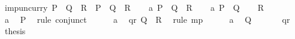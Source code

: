 %
\begin{isabellebody}%
\isanewline
\isamarkupfalse%
\ imp{\isacharunderscore}uncurry{}{\isacharcolon}\ {\isachardoublequote}P\ {\isasymlongrightarrow}\ {\isacharparenleft}Q\ {\isasymlongrightarrow}\ R{\isacharparenright}\ {\isasymLongrightarrow}\ {\isacharparenleft}P\ {\isasymand}\ Q{\isacharparenright}\ {\isasymlongrightarrow}\ R{\isachardoublequote}\isanewline
\isamarkupfalse%
\isanewline
\ \ \isamarkupfalse%
\ a{}{\isacharcolon}\ {\isachardoublequote}P\ {\isasymlongrightarrow}\ Q\ {\isasymlongrightarrow}\ R{\isachardoublequote}\isanewline
\ \ \isamarkupfalse%
\ a{}{\isacharcolon}\ {\isachardoublequote}P\ {\isasymand}\ Q{\isachardoublequote}\isanewline
\ \ \isamarkupfalse%
\ {\isachardoublequote}R{\isachardoublequote}\isanewline
\ \ \isamarkupfalse%
\ {\isacharminus}\isanewline
\ \ \ \ \isamarkupfalse%
\ a{}\ \isamarkupfalse%
\ P\ \isamarkupfalse%
\ {\isacharparenleft}rule\ conjunct{}{\isacharparenright}\isanewline
\ \ \ \ \isamarkupfalse%
\ a{}\ \isamarkupfalse%
\ qr{\isacharcolon}\ {\isachardoublequote}Q\ {\isasymlongrightarrow}\ R{\isachardoublequote}\ \isamarkupfalse%
\ {\isacharparenleft}rule\ mp{\isacharparenright}\isanewline
\ \ \ \ \isamarkupfalse%
\ a{}\ \isamarkupfalse%
\ Q\ \isamarkupfalse%
\isacommand{{\isachardot}{\isachardot}}\isanewline
\ \ \ \ \isamarkupfalse%
\ qr\ \isamarkupfalse%
\ {\isacharquery}thesis\ \isamarkupfalse%
\isacommand{{\isachardot}{\isachardot}}\isanewline
\ \ \isamarkupfalse%
\isanewline
\isamarkupfalse%
\isanewline
\end{isabellebody}%


